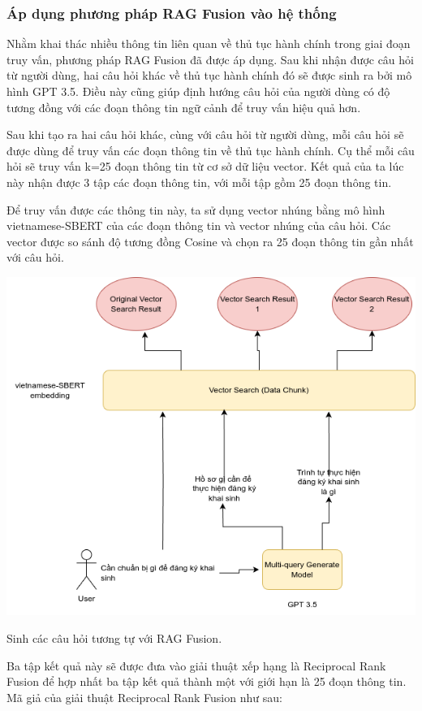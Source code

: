 \documentclass[a4paper, 12pt, openany]{book}
\begin{document}
\subsubsection{Áp dụng phương pháp RAG Fusion vào hệ thống}

Nhằm khai thác nhiều thông tin liên quan về thủ tục hành chính trong giai đoạn truy vấn, phương pháp RAG Fusion đã được áp dụng.
Sau khi nhận được câu hỏi từ người dùng, hai câu hỏi khác về thủ tục hành chính đó sẽ được sinh ra bởi mô hình GPT 3.5. Điều này cũng giúp
định hướng câu hỏi của người dùng có độ tương đồng với các đoạn thông tin ngữ cảnh để truy vấn hiệu quả hơn.

Sau khi tạo ra hai câu hỏi khác, cùng với câu hỏi từ người dùng, mỗi câu hỏi sẽ được dùng để truy vấn các đoạn thông tin về thủ tục hành chính.
Cụ thể mỗi câu hỏi sẽ truy vấn k=25 đoạn thông tin từ cơ sở dữ liệu vector. Kết quả của ta lúc này nhận được 3 tập các đoạn thông tin, với mỗi tập gồm
25 đoạn thông tin.

Để truy vấn được các thông tin này, ta sử dụng vector nhúng bằng mô hình vietnamese-SBERT của các đoạn thông tin
và vector nhúng của câu hỏi. Các vector được so sánh độ tương đồng Cosine và chọn ra 25 đoạn thông tin gần nhất với câu hỏi.

\vspace{0.5cm}
\begin{minipage}{\linewidth}
    \centering
    \includegraphics[width=.8\linewidth]{./assets/images/fusion1.png}
    \captionsetup{type=figure}
    \caption{Sinh các câu hỏi tương tự với RAG Fusion.}
\end{minipage}
\vspace{0.5cm}

Ba tập kết quả này sẽ được đưa vào giải thuật xếp hạng là Reciprocal Rank Fusion để hợp nhất ba tập kết quả thành một với giới hạn là 25 đoạn thông tin.
Mã giả của giải thuật Reciprocal Rank Fusion như sau:
\end{document}
